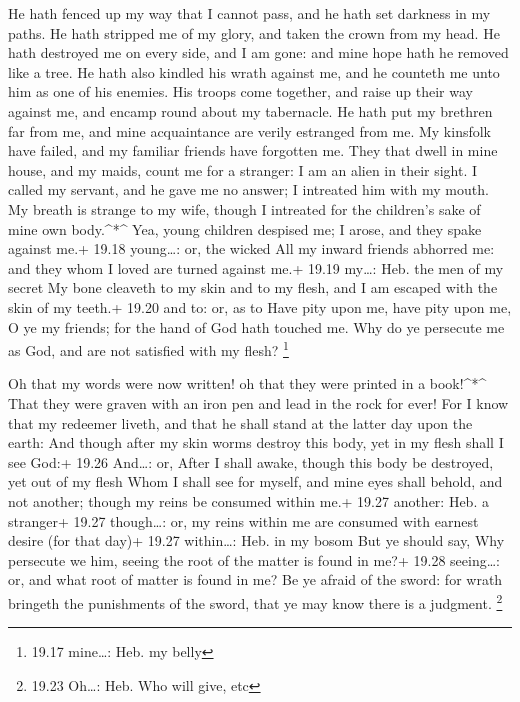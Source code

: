  He hath fenced up my way that I cannot pass, and he hath
set darkness in my paths.  He hath stripped me of my glory,
and taken the crown from my head.  He hath destroyed me on
every side, and I am gone: and mine hope hath he removed like a tree.
 He hath also kindled his wrath against me, and he counteth
me unto him as one of his enemies.  His troops come
together, and raise up their way against me, and encamp round about my
tabernacle.  He hath put my brethren far from me, and mine
acquaintance are verily estranged from me.  My kinsfolk
have failed, and my familiar friends have forgotten me. 
They that dwell in mine house, and my maids, count me for a stranger: I
am an alien in their sight.  I called my servant, and he
gave me no answer; I intreated him with my mouth.  My
breath is strange to my wife, though I intreated for the children's sake
of mine own body.\^{}*\^{}  Yea, young children despised
me; I arose, and they spake against me.+ 19.18 young\ldots: or, the
wicked  All my inward friends abhorred me: and they whom I
loved are turned against me.+ 19.19 my\ldots: Heb. the men of my secret
 My bone cleaveth to my skin and to my flesh, and I am
escaped with the skin of my teeth.+ 19.20 and to: or, as to
 Have pity upon me, have pity upon me, O ye my friends; for
the hand of God hath touched me.  Why do ye persecute me as
God, and are not satisfied with my flesh? \footnote{19.17 mine\ldots:
  Heb. my belly}

 Oh that my words were now written! oh that they were
printed in a book!\^{}*\^{}  That they were graven with an
iron pen and lead in the rock for ever!  For I know that my
redeemer liveth, and that he shall stand at the latter day upon the
earth:  And though after my skin worms destroy this body,
yet in my flesh shall I see God:+ 19.26 And\ldots: or, After I shall
awake, though this body be destroyed, yet out of my flesh 
Whom I shall see for myself, and mine eyes shall behold, and not
another; though my reins be consumed within me.+ 19.27 another: Heb. a
stranger+ 19.27 though\ldots: or, my reins within me are consumed with
earnest desire (for that day)+ 19.27 within\ldots: Heb. in my bosom
 But ye should say, Why persecute we him, seeing the root
of the matter is found in me?+ 19.28 seeing\ldots: or, and what root of
matter is found in me?  Be ye afraid of the sword: for
wrath bringeth the punishments of the sword, that ye may know there is a
judgment. \footnote{19.23 Oh\ldots: Heb. Who will give, etc}


